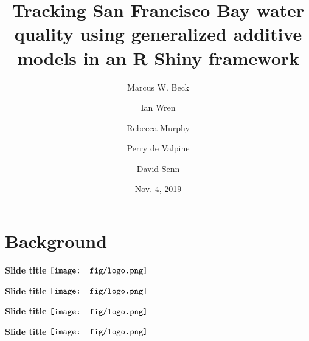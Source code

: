 \documentclass{beamer}
\begin{document}


\title[Tracking SF Bay Water Quality]{Tracking San Francisco Bay water quality using generalized additive models in an R Shiny framework}
\author[Beck et al.]{Marcus W. Beck \and Ian Wren \and Rebecca Murphy \and Perry de Valpine \and David Senn}


\date{Nov. 4, 2019}


\begin{frame}
\titlepage
\end{frame}

\section{Background}

\begin{frame}{\textbf{Slide title} \hspace{0pt plus 1 filll} $\vcenter{\hbox{\texttt{[image: fig/logo.png]}}}$}

\end{frame}

\begin{frame}{\textbf{Slide title} \hspace{0pt plus 1 filll} $\vcenter{\hbox{\texttt{[image: fig/logo.png]}}}$}

\end{frame}

\begin{frame}{\textbf{Slide title} \hspace{0pt plus 1 filll} $\vcenter{\hbox{\texttt{[image: fig/logo.png]}}}$}

\end{frame}

\begin{frame}{\textbf{Slide title} \hspace{0pt plus 1 filll} $\vcenter{\hbox{\texttt{[image: fig/logo.png]}}}$}

\end{frame}
\end{document}
